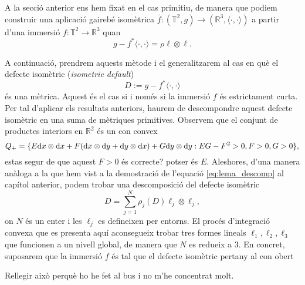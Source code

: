 A la secció anterior ens hem fixat en el cas primitiu, de manera que podiem construir una aplicació gairebé isomètrica $\bar f:(\mathbb T^2, g)\to(\mathbb R^3, \langle\cdot, \cdot\rangle)$ a partir d'una immersió $f:\mathbb T^2\to\mathbb R^3$ quan
\begin{equation*}
    g - f^*\langle\cdot, \cdot\rangle = \rho\ell\otimes\ell.
\end{equation*}

A continuació, prendrem aquests mètode i el generalitzarem al cas en què el defecte isomètric (\textit{isometric default}) 
\begin{equation*}
    D:=g-f^*\langle\cdot, \cdot\rangle
\end{equation*}
és una mètrica. Aquest és el cas si i només si la immersió $f$ és estrictament curta. Per tal d'aplicar els resultats anteriors, haurem de descompondre aquest defecte isomètric en una suma de mètriques primitives. Observem que el conjunt de productes interiors en $\mathbb R^2$ és un con convex
\begin{equation*}
    Q_+ = \{E\text dx\otimes\text dx + F(\text dx\otimes\text dy + \text dy\otimes\text dx) + G\text dy\otimes\text dy : EG-F^2>0, F>0, G>0\},
\end{equation*}
{\color{blue} estas segur de que aquest $F>0$ és correcte? potser és $E$.}
Aleshores, d'una manera anàloga a la que hem vist a la demostració de l'equació \ref{eq:lema_descomp} al capítol anterior, podem trobar una descomposició del defecte isomètric
\begin{equation*}
    D = \sum_{j=1}^N \rho_j(D) \ell_j\otimes\ell_j,
\end{equation*}
on $N$ és un enter i les $\ell_j$ es defineixen per entorns. El procés d'integració convexa que es presenta aquí aconsegueix trobar tres formes lineals $\ell_1, \ell_2, \ell_3$ que funcionen a un nivell global, de manera que $N$ es redueix a $3$.
En concret, suposarem que la immersió $f$ és tal que el defecte isomètric pertany al con obert

{\color{blue}Rellegir això perquè ho he fet al bus i no m'he concentrat molt.}

